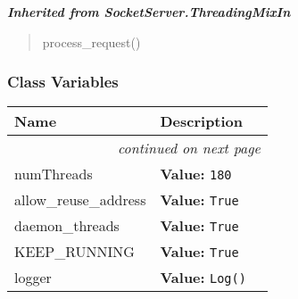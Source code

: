 \large{\textbf{\textit{Inherited from SocketServer.ThreadingMixIn}}}

\begin{quote}
process\_request()
\end{quote}


  \subsubsection{Class Variables}

    \vspace{-1cm}
\hspace{\varindent}\begin{longtable}{|p{\varnamewidth}|p{\vardescrwidth}|l}
\cline{1-2}
\cline{1-2} \centering \textbf{Name} & \centering \textbf{Description}& \\
\cline{1-2}
\endhead\cline{1-2}\multicolumn{3}{r}{\small\textit{continued on next page}}\\\endfoot\cline{1-2}
\endlastfoot\raggedright n\-u\-m\-T\-h\-r\-e\-a\-d\-s\- & \raggedright \textbf{Value:} 
{\tt 180}&\\
\cline{1-2}
\raggedright a\-l\-l\-o\-w\-\_\-r\-e\-u\-s\-e\-\_\-a\-d\-d\-r\-e\-s\-s\- & \raggedright \textbf{Value:} 
{\tt True}&\\
\cline{1-2}
\raggedright d\-a\-e\-m\-o\-n\-\_\-t\-h\-r\-e\-a\-d\-s\- & \raggedright \textbf{Value:} 
{\tt True}&\\
\cline{1-2}
\raggedright K\-E\-E\-P\-\_\-R\-U\-N\-N\-I\-N\-G\- & \raggedright \textbf{Value:} 
{\tt True}&\\
\cline{1-2}
\raggedright l\-o\-g\-g\-e\-r\- & \raggedright \textbf{Value:} 
{\tt Log()}&\\
\cline{1-2}
\end{longtable}

